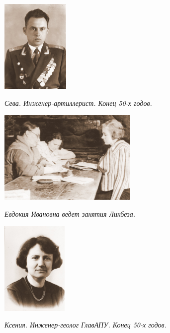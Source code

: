 \documentclass[utf8x, 12pt]{G7-32a} %
\begin{document}
\begin{figure}[h!]
    \begin{minipage}[h!]{50mm}
         \vspace{10pt}
         \begin{center}
         \vspace{-15pt}
         \includegraphics[height=45mm]{inc/Varzar/21.jpg} 
         \end{center}
         \vspace{-10pt}
         \itshape{Сева. Инженер-артиллерист. Конец 50-х годов.}
    \end{minipage}
    \hfill
   \begin{minipage}[h]{70mm}
       \begin{center}
       \includegraphics[height=45mm]{inc/Varzar/22.jpg} 
       \end{center}
       \itshape{Евдокия Ивановна ведет занятия Ликбеза.}
   \end{minipage}
   \hfill
    \begin{minipage}[h!]{50mm}
        \begin{center}
        \includegraphics[height=45mm]{inc/Varzar/23.jpg}
        \end{center}
        \itshape{Ксения. Инженер-геолог ГлавАПУ. Конец 50-х годов.}
    \end{minipage}
\end{figure}
\end{document}

